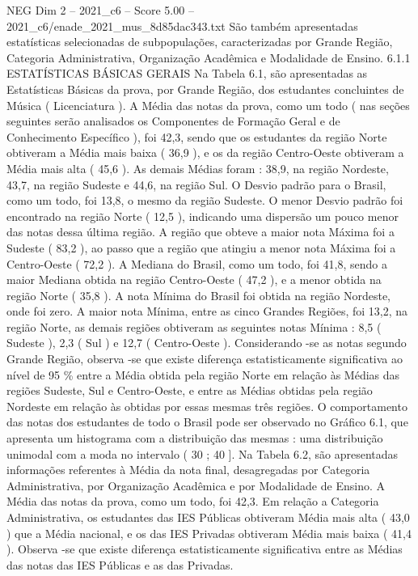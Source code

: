 \begin{textsample}{NEG Dim 2 – 2021\_c6 – Score 5.00 – 2021\_c6/enade\_2021\_mus\_8d85dac343.txt}
São também apresentadas estatísticas selecionadas de subpopulações, caracterizadas por Grande Região, Categoria Administrativa, Organização Acadêmica e Modalidade de Ensino. 6.1.1 ESTATÍSTICAS BÁSICAS GERAIS Na Tabela 6.1, são apresentadas as Estatísticas Básicas da prova, por Grande Região, dos estudantes concluintes de Música ( Licenciatura ).
A Média das notas da prova, como um todo ( nas seções seguintes serão analisados os Componentes de Formação Geral e de Conhecimento Específico ), foi 42,3, sendo que os estudantes da região Norte obtiveram a Média mais baixa ( 36,9 ), e os da região Centro-Oeste obtiveram a Média mais alta ( 45,6 ).
As demais Médias foram : 38,9, na região Nordeste, 43,7, na região Sudeste e 44,6, na região Sul.
O Desvio padrão para o Brasil, como um todo, foi 13,8, o mesmo da região Sudeste.
O menor Desvio padrão foi encontrado na região Norte ( 12,5 ), indicando uma dispersão um pouco menor das notas dessa última região.
A região que obteve a maior nota Máxima foi a Sudeste ( 83,2 ), ao passo que a região que atingiu a menor nota Máxima foi a Centro-Oeste ( 72,2 ).
A Mediana do Brasil, como um todo, foi 41,8, sendo a maior Mediana obtida na região Centro-Oeste ( 47,2 ), e a menor obtida na região Norte ( 35,8 ).
A nota Mínima do Brasil foi obtida na região Nordeste, onde foi zero.
A maior nota Mínima, entre as cinco Grandes Regiões, foi 13,2, na região Norte, as demais regiões obtiveram as seguintes notas Mínima : 8,5 ( Sudeste ), 2,3 ( Sul ) e 12,7 ( Centro-Oeste ).
Considerando -se as notas segundo Grande Região, observa -se que existe diferença estatisticamente significativa ao nível de 95 \% entre a Média obtida pela região Norte em relação às Médias das regiões Sudeste, Sul e Centro-Oeste, e entre as Médias obtidas pela região Nordeste em relação às obtidas por essas mesmas três regiões.
O comportamento das notas dos estudantes de todo o Brasil pode ser observado no Gráfico 6.1, que apresenta um histograma com a distribuição das mesmas : uma distribuição unimodal com a moda no intervalo ( 30 ; 40 ].
Na Tabela 6.2, são apresentadas informações referentes à Média da nota final, desagregadas por Categoria Administrativa, por Organização Acadêmica e por Modalidade de Ensino.
A Média das notas da prova, como um todo, foi 42,3.
Em relação a Categoria Administrativa, os estudantes das IES Públicas obtiveram Média mais alta ( 43,0 ) que a Média nacional, e os das IES Privadas obtiveram Média mais baixa ( 41,4 ).
Observa -se que existe diferença estatisticamente significativa entre as Médias das notas das IES Públicas e as das Privadas.

\end{textsample}
